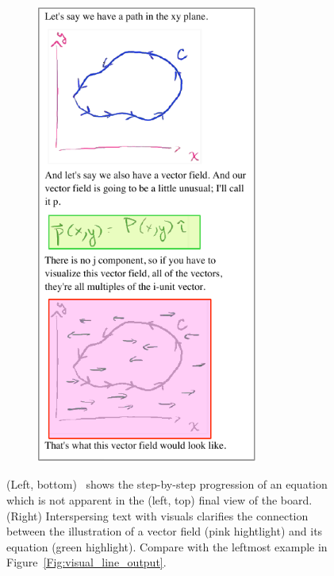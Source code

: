 \begin{figure}[h!]
\begin{subfigure}[t]{1.8in}
        \includegraphics[width=0.8\textwidth]{figures/intersperse_highlight.pdf}
    \end{subfigure}
    \caption{(Left, bottom) \systemname\ shows the step-by-step progression of an equation  which is not apparent in the (left, top) final view of the board. (Right) Interspersing text with visuals clarifies the connection between the illustration of a vector field (pink hightlight) and its equation (green highlight). Compare with the leftmost example in Figure~\ref{Fig:visual_line_output}.}
    \label{Fig:feature_highlight}
\end{figure} 
%

